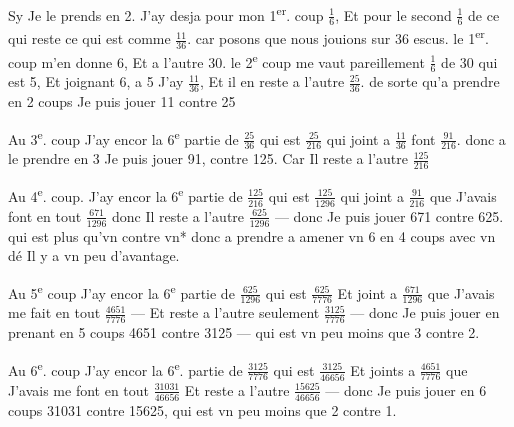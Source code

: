 \documentclass[11pt,a4paper]{article}
\begin{document}
Sy Je le prends en 2. J'ay desja pour mon 1\textsuperscript{er}. coup $\frac{1}{6}$, Et pour le second $\frac{1}{6}$ de ce qui reste ce qui est comme $\frac{11}{36}$. car posons que nous jouions sur 36 escus. le 1\textsuperscript{er}. coup m'en donne 6, Et a l'autre 30. le 2\textsuperscript{e} coup me vaut pareillement $\frac{1}{6}$ de 30 qui est 5, Et joignant 6, a 5 J'ay $\frac{11}{36}$, Et il en reste a l'autre $\frac{25}{36}$. de sorte qu'a prendre en 2 coups Je puis jouer 11 contre 25

Au 3\textsuperscript{e}. coup J'ay encor la 6\textsuperscript{e} partie de $\frac{25}{36}$ qui est $\frac{25}{216}$ qui joint a $\frac{11}{36}$ font $\frac{91}{216}$. donc a le prendre en 3 Je puis jouer 91, contre  125. Car Il reste a l'autre $\frac{125}{216}$

Au 4\textsuperscript{e}. coup. J'ay encor la 6\textsuperscript{e} partie de $\frac{125}{216}$ qui est $\frac{125}{1296}$ qui joint a $\frac{91}{216}$ que J'avais font en tout $\frac{671}{1296}$ donc Il reste a l'autre $\frac{625}{1296}$ — donc Je puis jouer 671 contre 625. qui est plus qu'vn contre vn* donc a prendre a amener vn 6 en 4 coups avec vn dé Il y a vn peu d'avantage.

Au 5\textsuperscript{e} coup J'ay encor la 6\textsuperscript{e} partie de $\frac{625}{1296}$ qui est $\frac{625}{7776}$ Et joint a $\frac{671}{1296}$ que J'avais me fait en tout $\frac{4651}{7776}$ — Et reste a l'autre seulement $\frac{3125}{7776}$ — donc Je puis jouer en prenant en 5 coups 4651 contre 3125 — qui est vn peu moins que 3 contre 2.


Au 6\textsuperscript{e}. coup J'ay encor la 6\textsuperscript{e}. partie de $\frac{3125}{7776}$ qui est $\frac{3125}{46656}$ Et joints a $\frac{4651}{7776}$ que J'avais me font en tout $\frac{31031}{46656}$ Et reste a l'autre $\frac{15625}{46656}$ — donc Je puis jouer en 6 coups 31031 contre 15625, qui est vn peu moins que 2 contre 1.
\end{document}
